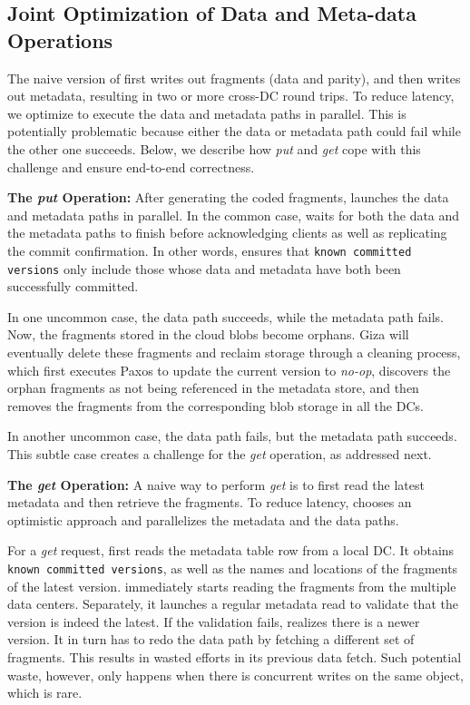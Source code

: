 \subsection{Joint Optimization of Data and Meta-data Operations}

The naive version of \name first writes out fragments (data and parity), and
then writes out metadata, resulting in two or more cross-DC round trips. To
reduce latency, we optimize \name to execute the data and metadata paths in
parallel. This is potentially problematic because either the data or metadata
path could fail while the other one succeeds. Below, we describe how {\em put}
and {\em get} cope with this challenge and ensure end-to-end correctness.

{\bf The \emph{put} Operation:} After generating the coded fragments, \name
launches the data and metadata paths in parallel. In the common case, \name
waits for both the data and the metadata paths to finish before acknowledging
clients as well as replicating the commit confirmation. In other words, \name
ensures that {\tt known committed versions} only include those whose data and
metadata have both been successfully committed.

In one uncommon case, the data path succeeds, while the metadata path fails.
Now, the fragments stored in the cloud blobs become orphans.
Giza will eventually delete these fragments and reclaim storage through a cleaning process,
which first executes Paxos to update the current version to {\em no-op},
discovers the orphan fragments as not being referenced in the metadata store, 
and then removes the fragments from the corresponding blob storage in all the DCs.

In another uncommon case, the data path fails, but the metadata path succeeds.
This subtle case creates a challenge for the {\em get} operation, as addressed
next.

{\bf The \emph{get} Operation:}
A naive way to perform {\em get} is to first read the latest metadata and then retrieve the fragments.
To reduce latency, {\name} chooses an optimistic approach and parallelizes the metadata and the data paths.

For a {\em get} request, {\name} first reads the metadata table row from a local DC.
It obtains {\tt known committed versions}, 
as well as the names and locations of the fragments of the latest version.
\name immediately starts reading the fragments from the multiple data centers.
Separately, it launches a regular metadata read to validate that the version is indeed the latest.
If the validation fails, \name realizes there is a newer version.
It in turn has to redo the data path by fetching a different set of fragments.
This results in wasted efforts in its previous data fetch.
Such potential waste, however, only happens when there is concurrent writes on the same object,
which is rare.

